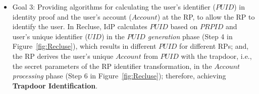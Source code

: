 \begin{itemize}
  \item Goal 3: Providing algorithms for calculating the user's identifier ($PUID$) in identity proof and the user's account ($Account$) at the RP,
   to allow the RP to identify the user.
  In Recluse, IdP calculates $PUID$ based on $PRPID$ and user's unique identifier ($UID$) in the \emph{$PUID$ generation} phase (Step 4 in Figure~\ref{fig:Recluse}), which results in different $PUID$  for different RPs;
  and,  the RP derives the user's unique $Account$  from $PUID$ with the  trapdoor, i.e., the secret parameters of the RP identifier transformation,   in the \emph{$Account$ processing} phase (Step 6 in Figure~\ref{fig:Recluse});
   therefore, achieving \textbf{Trapdoor Identification}.




\end{itemize}


